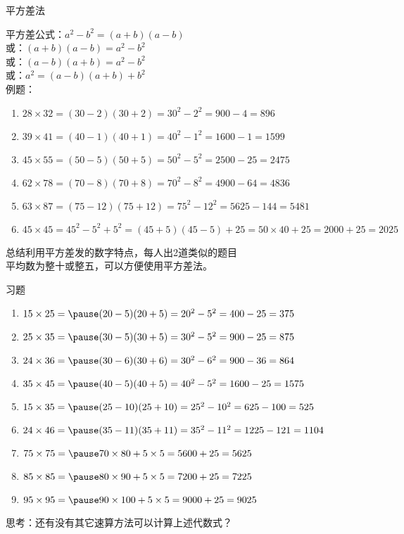 \documentclass[aspectratio=169]{ctexbeamer} %
\date{\today}
\begin{document}
\begin{frame}[t]{平方差法}
\begin{spacing}{1.2}
\normalsize
平方差公式：$a^2 - b^2 = (a+b)(a-b)$ \\
或：$(a+b)(a-b)=a^2 - b^2$ \\
或：$(a-b)(a+b)=a^2 - b^2$ \\
或：$a^2 = (a-b)(a+b) + b^2$ \\
例题：
\begin{enumerate}[label={\arabic*.}]
\item $28 \times 32 = (30-2)(30+2)=30^2-2^2=900-4=896$
\item $39 \times 41 = (40-1)(40+1)=40^2-1^2=1600-1=1599$
\item $45 \times 55 = (50-5)(50+5)=50^2-5^2=2500-25=2475$
\item $62 \times 78 = (70-8)(70+8)=70^2-8^2=4900-64=4836$
\item $63 \times 87 = (75-12)(75+12)=75^2-12^2=5625-144=5481$
\item $45 \times 45 = 45^2 - 5^2 + 5^2 = (45+5)(45-5) + 25 =50 \times 40 + 25=2000 + 25 = 2025$
\end{enumerate}
\alert{总结利用平方差发的数字特点，每人出2道类似的题目} \\
\pause
平均数为整十或整五，可以方便使用平方差法。
\end{spacing}
\end{frame}

\begin{frame}[t]{习题}
\begin{spacing}{1.2}
\normalsize
\begin{enumerate}[label={\arabic*.}]
\item $15 \times 25 = \pause (20-5)(20+5) = 20^2-5^2 = 400-25 = 375$
\item $25 \times 35 = \pause (30-5)(30+5) = 30^2-5^2 = 900-25 = 875$
\item $24 \times 36 = \pause (30-6)(30+6) = 30^2-6^2 = 900-36 = 864$
\item $35 \times 45 = \pause (40-5)(40+5) = 40^2-5^2 = 1600-25 = 1575$
\item $15 \times 35 = \pause (25-10)(25+10) = 25^2-10^2 = 625-100 = 525$
\item $24 \times 46 = \pause (35-11)(35+11) = 35^2-11^2 = 1225-121 = 1104$
\item $75 \times 75 = \pause 70 \times 80 + 5 \times 5 = 5600 + 25 = 5625$
\item $85 \times 85 = \pause 80 \times 90 + 5 \times 5 = 7200 + 25 = 7225$
\item $95 \times 95 = \pause 90 \times 100 + 5 \times 5 = 9000 + 25 = 9025$
\end{enumerate}
\alert{思考：还有没有其它速算方法可以计算上述代数式？}
\end{spacing}
\end{frame}
\end{document}
